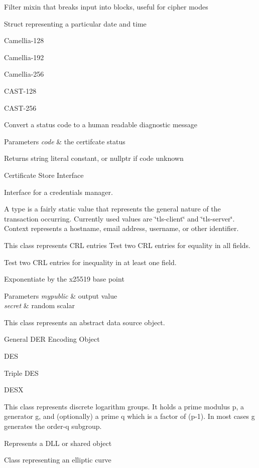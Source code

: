Filter mixin that breaks input into blocks, useful for cipher modes

Struct representing a particular date and time

Camellia-\/128

Camellia-\/192

Camellia-\/256

C\+A\+S\+T-\/128

C\+A\+S\+T-\/256

Convert a status code to a human readable diagnostic message 
\begin{DoxyParams}{Parameters}
{\em code} & the certifcate status \\
\hline
\end{DoxyParams}
\begin{DoxyReturn}{Returns}
string literal constant, or nullptr if code unknown
\end{DoxyReturn}
Certificate Store Interface

Interface for a credentials manager.

A type is a fairly static value that represents the general nature of the transaction occurring. Currently used values are \char`\"{}tls-\/client\char`\"{} and \char`\"{}tls-\/server\char`\"{}. Context represents a hostname, email address, username, or other identifier.

This class represents C\+RL entries Test two C\+RL entries for equality in all fields.

Test two C\+RL entries for inequality in at least one field.

Exponentiate by the x25519 base point 
\begin{DoxyParams}{Parameters}
{\em mypublic} & output value \\
\hline
{\em secret} & random scalar\\
\hline
\end{DoxyParams}
This class represents an abstract data source object.

General D\+ER Encoding Object

D\+ES

Triple D\+ES

D\+E\+SX

This class represents discrete logarithm groups. It holds a prime modulus p, a generator g, and (optionally) a prime q which is a factor of (p-\/1). In most cases g generates the order-\/q subgroup.

Represents a D\+LL or shared object

Class representing an elliptic curve

